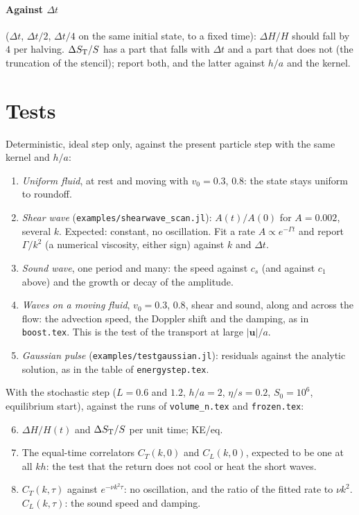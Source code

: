 \documentclass[11pt,aps,preprint,nofootinbib,superscriptaddress,tightenlines]{revtex4-2}
\let\oldparagraph\paragraph
\renewcommand{\paragraph}{\par\bigskip\oldparagraph}
\begin{document}
\paragraph{Against $\Delta t$} ($\Delta t$, $\Delta t/2$, $\Delta t/4$ on the same
initial state, to a fixed time): $\Delta H/H$ should fall by $4$ per halving.
$\Delta S_{\rm T}/S$ has a part that falls with $\Delta t$ and a part that does not
(the truncation of the stencil); report both, and the latter against $h/a$ and the
kernel.

\section{Tests}
\label{sec:tests}

Deterministic, ideal step only, against the present particle step with the same
kernel and $h/a$:
\begin{enumerate}
\item \emph{Uniform fluid}, at rest and moving with $v_0=0.3$, $0.8$: the state stays
  uniform to roundoff.
\item \emph{Shear wave} (\texttt{examples/shearwave\_scan.jl}): $A(t)/A(0)$ for
  $A=0.002$, several $k$.  Expected: constant, no oscillation.  Fit a rate
  $A\propto e^{-\Gamma t}$ and report $\Gamma/k^2$ (a numerical viscosity, either
  sign) against $k$ and $\Delta t$.
\item \emph{Sound wave}, one period and many: the speed against $c_s$ (and against
  $c_1$ above) and the growth or decay of the amplitude.
\item \emph{Waves on a moving fluid}, $v_0=0.3$, $0.8$, shear and sound, along and
  across the flow: the advection speed, the Doppler shift and the damping, as in
  \texttt{boost.tex}.  This is the test of the transport at large $|\bm u|/a$.
\item \emph{Gaussian pulse} (\texttt{examples/testgaussian.jl}): residuals against
  the analytic solution, as in the table of \texttt{energystep.tex}.
\end{enumerate}
With the stochastic step ($L=0.6$ and $1.2$, $h/a=2$, $\eta/s=0.2$, $S_0=10^6$,
equilibrium start), against the runs of \texttt{volume\_n.tex} and
\texttt{frozen.tex}:
\begin{enumerate}
\setcounter{enumi}{5}
\item $\Delta H/H(t)$ and $\Delta S_{\rm T}/S$ per unit time; KE/eq.
\item The equal-time correlators $C_T(k,0)$ and $C_L(k,0)$, expected to be one at all
  $kh$: the test that the return does not cool or heat the short waves.
\item $C_T(k,\tau)$ against $e^{-\nu k^2\tau}$: no oscillation, and the ratio of the
  fitted rate to $\nu k^2$.  $C_L(k,\tau)$: the sound speed and damping.
\end{enumerate}
\end{document}
